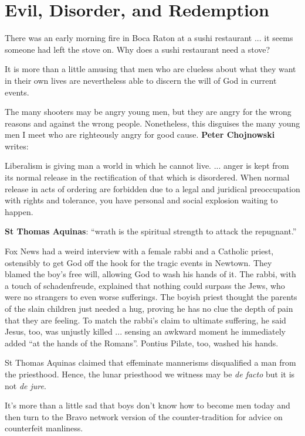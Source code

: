 \section{Evil, Disorder, and Redemption}

There was an early morning fire in Boca Raton at a sushi restaurant ... it seems someone had left the stove on. Why does a sushi restaurant need a stove?

It is more than a little amusing that men who are clueless about what they want in their own lives are nevertheless able to discern the will of God in current events.

The many shooters may be angry young men, but they are angry for the wrong reasons and against the wrong people. Nonetheless, this disguises the many young men I meet who are righteously angry for good cause. \textbf{Peter Chojnowski} writes:

\begin{quotex}
Liberalism is giving man a world in which he cannot live. ... anger is kept from its normal release in the rectification of that which is disordered. When normal release in acts of ordering are forbidden due to a legal and juridical preoccupation with rights and tolerance, you have personal and social explosion waiting to happen.
\end{quotex}


\textbf{St Thomas Aquinas}: ``wrath is the spiritual strength to attack the repugnant.''

Fox News had a weird interview with a female rabbi and a Catholic priest, ostensibly to get God off the hook for the tragic events in Newtown. They blamed the boy's free will, allowing God to wash his hands of it. The rabbi, with a touch of schadenfreude, explained that nothing could surpass the Jews, who were no strangers to even worse sufferings. The boyish priest thought the parents of the slain children just needed a hug, proving he has no clue the depth of pain that they are feeling. To match the rabbi's claim to ultimate suffering, he said Jesus, too, was unjustly killed ... sensing an awkward moment he immediately added ``at the hands of the Romans''. Pontius Pilate, too, washed his hands.

St Thomas Aquinas claimed that effeminate mannerisms disqualified a man from the priesthood. Hence, the lunar priesthood we witness may be \emph{de facto} but it is not \emph{de jure}.

It's more than a little sad that boys don't know how to become men today and then turn to the Bravo network version of the counter-tradition for advice on counterfeit manliness.

